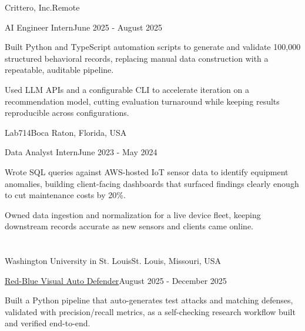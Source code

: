 \documentclass[10pt, letterpaper]{article}
\begin{document}
\vspace{\entrySpacing}
\begin{leadershipentry}{Crittero, Inc.}{Remote}
	\begin{positionentry}{AI Engineer Intern}{June 2025 - August 2025}
		\item Built Python and TypeScript automation scripts to generate and validate 100,000 structured behavioral records, replacing manual data construction with a repeatable, auditable pipeline.
		\item Used LLM APIs and a configurable CLI to accelerate iteration on a recommendation model, cutting evaluation turnaround while keeping results reproducible across configurations.
	\end{positionentry}
\end{leadershipentry}

\vspace{\entrySpacing}
\begin{leadershipentry}{Lab714}{Boca Raton, Florida, USA}
	\begin{positionentry}{Data Analyst Intern}{June 2023 - May 2024}
		\item Wrote SQL queries against AWS-hosted IoT sensor data to identify equipment anomalies, building client-facing dashboards that surfaced findings clearly enough to cut maintenance costs by 20\%.
		\item Owned data ingestion and normalization for a live device fleet, keeping downstream records accurate as new sensors and clients came online.
	\end{positionentry}
\end{leadershipentry}

\vspace{\headerSpacing}


\section{}

\vspace{\entrySpacing}
\begin{leadershipentry}{Washington University in St. Louis}{St. Louis, Missouri, USA}
	\begin{positionentry}{\href{https://github.com/agopalareddy/visual-jailbreak-defense}{Red-Blue Visual Auto Defender}}{August 2025 - December 2025}
		\item Built a Python pipeline that auto-generates test attacks and matching defenses, validated with precision/recall metrics, as a self-checking research workflow built and verified end-to-end.
	\end{positionentry}
\end{leadershipentry}
\end{document}
